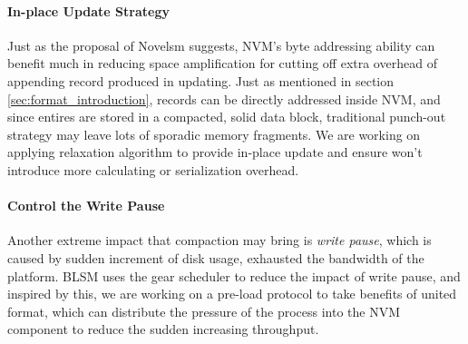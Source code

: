 \paragraph{In-place Update Strategy}
Just as the proposal of Novelsm\cite{kannan2018redesigning} suggests, NVM's byte addressing ability can benefit much in reducing space amplification for cutting off extra overhead of appending record produced in updating. Just as mentioned in section \ref{sec:format_introduction}, records can be directly addressed inside NVM, and since entires are stored in a compacted, solid data block, traditional punch-out strategy may leave lots of sporadic memory fragments. We are working on applying relaxation algorithm to provide in-place update and ensure won't introduce more calculating or serialization overhead.

\paragraph{Control the Write Pause}
Another extreme impact that compaction may bring is \textit{write pause}, which is caused by sudden increment of disk usage, exhausted the bandwidth of the platform. BLSM uses the gear scheduler to reduce the impact of write pause, and inspired by this, we are working on a pre-load protocol to take benefits of united format, which can distribute the pressure of the process into the NVM component to reduce the sudden increasing throughput.







